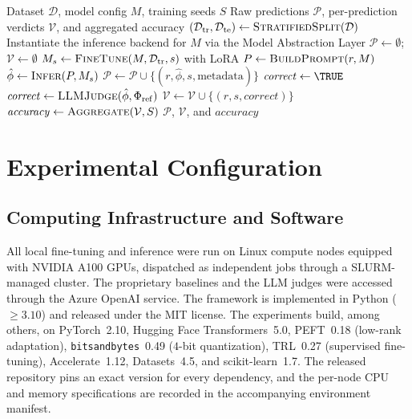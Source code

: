\documentclass[letterpaper]{article}
\begin{document}
\begin{algorithm}[t]
\caption{Translation and Evaluation}
\label{alg:pipeline}
\begin{algorithmic}[1]
\REQUIRE Dataset $\mathcal{D}$, model config $M$, training seeds $S$
\ENSURE Raw predictions $\mathcal{P}$, per-prediction verdicts $\mathcal{V}$, and aggregated accuracy
\STATE $(\mathcal{D}_{\mathrm{tr}}, \mathcal{D}_{\mathrm{te}}) \gets \textsc{StratifiedSplit}(\mathcal{D})$ 
\STATE Instantiate the inference backend for $M$ via the Model Abstraction Layer
\STATE $\mathcal{P} \gets \emptyset$;\quad $\mathcal{V} \gets \emptyset$ 
    \STATE $M_s \gets \textsc{FineTune}(M, \mathcal{D}_{\mathrm{tr}}, s)$ with LoRA 
        \STATE $P \gets \textsc{BuildPrompt}(r, M)$ 
        \STATE $\hat{\phi} \gets \textsc{Infer}(P, M_s)$ 
        \STATE $\mathcal{P} \gets \mathcal{P} \cup \{(r, \hat{\phi}, s, \text{metadata})\}$
    \ENDFOR
\ENDFOR
{}
        \STATE $\mathit{correct} \gets \TRUE$
    \ELSE
        \STATE $\mathit{correct} \gets \textsc{LLMJudge}(\hat{\phi}, \Phi_{\mathrm{ref}})$
    \ENDIF
    \STATE $\mathcal{V} \gets \mathcal{V} \cup \{(r, s, \mathit{correct})\}$ 
\ENDFOR
\STATE $\mathit{accuracy} \gets \textsc{Aggregate}(\mathcal{V}, S)$ 
\RETURN $\mathcal{P}$, $\mathcal{V}$, and $\mathit{accuracy}$
\end{algorithmic}
\end{algorithm}

\section{Experimental Configuration}
\label{app:config}

\subsection{Computing Infrastructure and Software}
All local fine-tuning and inference were run on Linux compute nodes equipped with NVIDIA A100 GPUs, dispatched as independent jobs through a SLURM-managed cluster. The proprietary baselines and the LLM judges were accessed through the Azure OpenAI service. The framework is implemented in Python ($\geq 3.10$) and released under the MIT license. The experiments build, among others, on PyTorch~2.10, Hugging Face Transformers~5.0, PEFT~0.18 (low-rank adaptation), \texttt{bitsandbytes}~0.49 ($4$-bit quantization), TRL~0.27 (supervised fine-tuning), Accelerate~1.12, Datasets~4.5, and scikit-learn~1.7. The released repository pins an exact version for every dependency, and the per-node CPU and memory specifications are recorded in the accompanying environment manifest.
\end{document}
